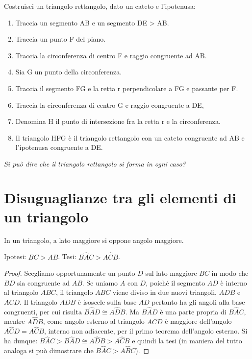 \begin{procedura}
  Costruisci un triangolo rettangolo, dato un cateto e l'ipotenusa:
  \begin{enumerate} [nosep]
    \item 
    Traccia un segmento AB e un segmento DE > AB.
    \item 
    Traccia un punto F del piano.
    \item 
    Traccia la circonferenza di centro F e raggio congruente ad AB.
    \item 
    Sia G un punto della circonferenza.
    \item 
    Traccia il segmento FG e la retta r perpendicolare a FG e passante per F.
    \item 
    Traccia la circonferenza di centro G e raggio congruente a DE,
    \item 
    Denomina H il punto di intersezione fra la retta r e la circonferenza.
    \item 
    Il triangolo HFG è il triangolo rettangolo con un cateto congruente ad AB e 
l'ipotenusa congruente a DE.
  \end{enumerate}
  \textsl{Si può dire che il triangolo rettangolo si forma in ogni caso?}
\end{procedura}

\section{Disuguaglianze tra gli elementi di un 
  triangolo}\label{sect:disuguaglianze_triangoli}

\begin{teorema}
  In un triangolo, a lato maggiore si oppone angolo maggiore.
\end{teorema}

\noindent\begin{minipage}{0.7\textwidth}
  \noindent Ipotesi: $BC>AB$. Tesi: $B\widehat{A}C>A\widehat{C}B$.
  
  \begin{proof}
    Scegliamo opportunamente un punto $D$ sul lato maggiore $BC$ in modo 
    che $BD$ sia congruente ad $AB$. Se uniamo $A$ con $D$, poiché il 
    segmento $AD$ è interno al triangolo $ABC$, il triangolo $ABC$ viene 
    diviso in due nuovi triangoli, $ADB$ e $ACD$. Il triangolo $ADB$ è 
    isoscele sulla base $AD$ pertanto ha gli angoli alla base congruenti, 
    per cui risulta $B\widehat{A}D\cong A\widehat{D}B$. Ma 
    $B\widehat{A}D$ è una parte propria di $B\widehat{A}C$, mentre 
    $A\widehat{D}B$, come angolo esterno al triangolo $ACD$ è maggiore 
    dell'angolo $A\widehat{C}D=A\widehat{C}B$, interno non adiacente, per 
    il primo teorema dell'angolo esterno. Si ha dunque: 
    $B\widehat{A}C>B\widehat{A}D\cong A\widehat{D}B>A\widehat{C}B$ e 
    quindi la tesi (in maniera del tutto analoga si può dimostrare che 
    $B\widehat{A}C>A\widehat{B}C$).
  \end{proof}
\end{minipage}\hfil
\begin{minipage}{0.3\textwidth}
  \centering
\end{minipage}

